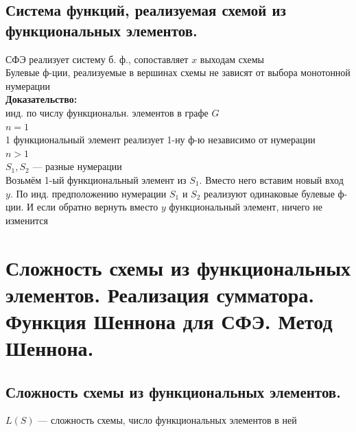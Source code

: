\documentclass[12pt]{article}
\begin{document}
\subsection{Система функций, реализуемая схемой из функциональных элементов.}
	СФЭ реализует систему б. ф., сопоставляет $x$ выходам схемы\\
	Булевые ф-ции, реализуемые в вершинах схемы не зависят от выбора монотонной нумерации\\
	\textbf{Доказательство:}\\
		инд. по числу функциональн. элементов в графе $G$\\
		$n = 1$\\
		1 функциональный элемент реализует 1-ну ф-ю независимо от нумерации\\
		$n > 1$\\
		$S_1, S_2$ — разные нумерации\\
		Возьмём 1-ый функциональный элемент из $S_1$. Вместо него вставим новый вход $y$. По инд. предположению нумерации $S_1$ и $S_2$ реализуют одинаковые булевые ф-ции. И если обратно вернуть вместо $y$ функциональный элемент, ничего не изменится\\
	\qedsymbol

\section{Сложность схемы из функциональных элементов. Реализация сумматора. Функция Шеннона для СФЭ. Метод Шеннона.}
\subsection{Сложность схемы из функциональных элементов.}
	$L(S)$ — сложность схемы, число функциональных элементов в ней\\
\end{document}
